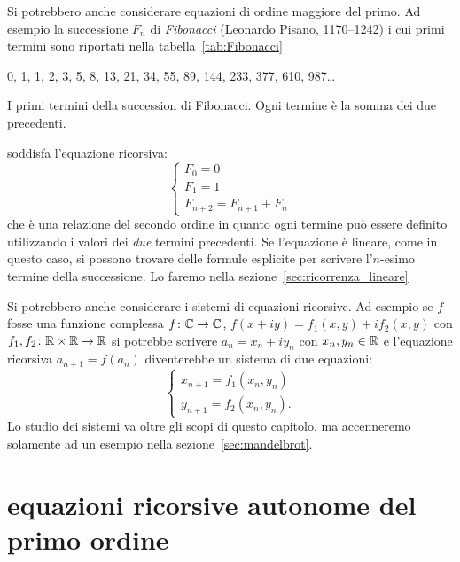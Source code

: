 Si potrebbero anche considerare equazioni di ordine maggiore del
primo. Ad esempio la successione $F_n$ di \emph{Fibonacci}
(Leonardo Pisano, 1170--1242)
i cui primi termini sono riportati nella tabella~\ref{tab:Fibonacci}
\begin{table}
  \begin{center}
  0, 1, 1, 2, 3, 5, 8, 13, 21, 34, 55, 89, 144,
  233, 377, 610, 987\dots
\end{center}
\caption{I primi termini della succession di Fibonacci.
Ogni termine è la somma dei due precedenti.}
\label{tab:Fibonacci}
\end{table}
%
%
%
soddisfa l'equazione ricorsiva:
\begin{equation}\label{eq:Fibonacci}
\begin{cases}
  F_0 = 0 \\
  F_1 = 1 \\
  F_{n+2} = F_{n+1} + F_n
\end{cases}
\end{equation}
che è una relazione del secondo ordine in quanto ogni termine può
essere definito utilizzando i valori dei \emph{due} termini precedenti.
Se l'equazione è lineare, come in questo caso, si possono trovare delle
formule esplicite per scrivere l'$n$-esimo termine della successione.
Lo faremo nella sezione~\ref{sec:ricorrenza_lineare}

Si potrebbero anche considerare i sistemi di equazioni ricorsive.
Ad esempio se $f$ fosse una funzione complessa $f\colon \mathbb C \to \mathbb C$,
$f(x+iy) = f_1(x,y) + i f_2(x,y)$ con $f_1,f_2 \colon \mathbb R\times\mathbb R\to\mathbb R$
si potrebbe scrivere $a_n = x_n + i y_n$ con $x_n, y_n \in \mathbb R$
e l'equazione ricorsiva $a_{n+1} = f(a_n)$
diventerebbe un sistema di due equazioni:
\[
  \begin{cases}
    x_{n+1} = f_1(x_n, y_n)\\
    y_{n+1} = f_2(x_n, y_n).
  \end{cases}
\]
Lo studio dei sistemi va oltre gli scopi di questo capitolo,
ma accenneremo solamente ad un esempio nella sezione~\ref{sec:mandelbrot}.

\section{equazioni ricorsive autonome del primo ordine}

